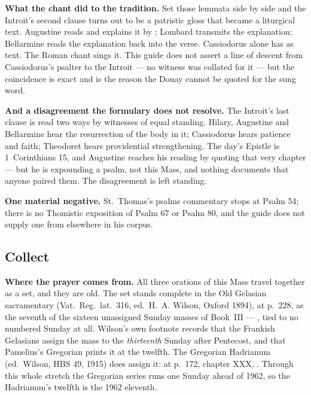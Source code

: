 \textbf{What the chant did to the tradition.} Set those lemmata side by side and
the Introit's second clause turns out to be a patristic gloss that became a
liturgical text. Augustine reads  and explains it by
; Lombard transmits the explanation; Bellarmine reads the
explanation back into the verse. Cassiodorus alone has  as
text. The Roman chant sings it. This guide does not assert a line of descent
from Cassiodorus's psalter to the Introit --- no 
witness was collated for it --- but the coincidence is exact and is the reason
the Douay cannot be quoted for the sung word.

\textbf{And a disagreement the formulary does not resolve.} The Introit's last
clause is read two ways by witnesses of equal standing. Hilary, Augustine and
Bellarmine hear the resurrection of the body in it; Cassiodorus hears patience
and faith; Theodoret hears providential strengthening. The day's Epistle is
1~Corinthians 15, and Augustine reaches his reading by quoting that very
chapter --- but he is expounding a psalm, not this Mass, and nothing documents
that anyone paired them. The disagreement is left standing.

\textbf{One material negative.} St.~Thomas's psalms commentary stops at Psalm
54; there is no Thomistic exposition of Psalm 67 or Psalm 80, and the guide
does not supply one from elsewhere in his corpus.

\elementguard
\subsection*{Collect }


\textbf{Where the prayer comes from.} All three orations of this Mass travel
together as a set, and they are old. The set stands complete in the Old
Gelasian sacramentary (Vat.~Reg.~lat.~316, ed.\ H.~A. Wilson, Oxford 1894), at
p.~228, as the seventh of the sixteen unassigned Sunday masses of Book~III ---
, tied to no numbered Sunday at all. Wilson's own
footnote records that the Frankish Gelasians assign the mass to the
\textit{thirteenth} Sunday after Pentecost, and that Pamelius's Gregorian
prints it at the twelfth. The Gregorian Hadrianum (ed.\ Wilson, HBS 49, 1915)
does assign it: at p.~172, chapter XXX, . Through this whole stretch the Gregorian series runs one Sunday
ahead of 1962, so the Hadrianum's twelfth is the 1962 eleventh.

